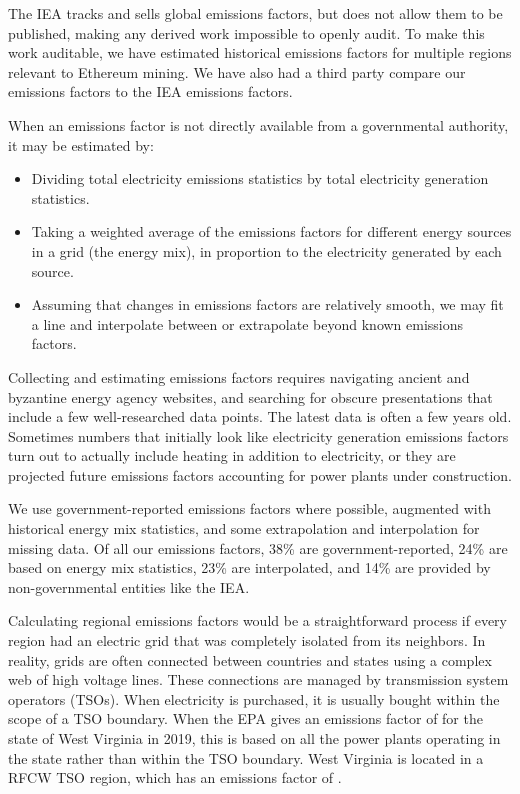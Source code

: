 \begin{appendices}
The IEA tracks and sells global emissions factors\cite{iea_emissions_2021}, but does not allow them to be published, making any derived work impossible to openly audit. To make this work auditable, we have estimated historical emissions factors for multiple regions relevant to Ethereum mining. We have also had a third party compare our emissions factors to the IEA emissions factors.

When an emissions factor is not directly available from a governmental authority, it may be estimated by:

\begin{itemize}
    \item Dividing total electricity emissions statistics by total electricity generation statistics.
    \item Taking a weighted average of the emissions factors for different energy sources in a grid (the energy mix), in proportion to the electricity generated by each source.
    \item Assuming that changes in emissions factors are relatively smooth, we may fit a line and interpolate between or extrapolate beyond known emissions factors.
\end{itemize}

Collecting and estimating emissions factors requires navigating ancient and byzantine energy agency websites, and searching for obscure presentations that include a few well-researched data points. The latest data is often a few years old. Sometimes numbers that initially look like electricity generation emissions factors turn out to actually include heating in addition to electricity, or they are projected future emissions factors accounting for power plants under construction.

We use government-reported emissions factors where possible, augmented with historical energy mix statistics, and some extrapolation and interpolation for missing data. Of all our emissions factors, 38\% are government-reported, 24\% are based on energy mix statistics, 23\% are interpolated, and 14\% are provided by non-governmental entities like the IEA.

Calculating regional emissions factors would be a straightforward process if every region had an electric grid that was completely isolated from its neighbors. In reality, grids are often connected between countries and states using a complex web of high voltage lines. These connections are managed by transmission system operators (TSOs). When electricity is purchased, it is usually bought within the scope of a TSO boundary. When the EPA gives an emissions factor of  for the state of West Virginia in 2019, this is based on all the power plants operating in the state rather than within the TSO boundary. West Virginia is located in a RFCW TSO region, which has an emissions factor of .


\end{appendices}
